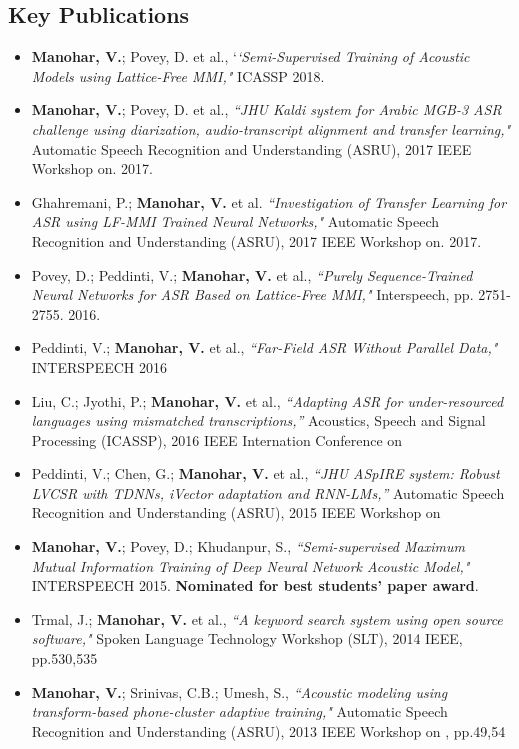 \documentclass[margin,line,pifont,palatino,courier]{res}
\begin{document}
\begin{resume}
\section{\sc Key Publications}
\begin{itemize}
  \item 
  \textbf{Manohar, V.}; Povey, D. et al., `\textit{`Semi-Supervised Training of Acoustic Models using Lattice-Free MMI,"} ICASSP 2018.
  \item
    \textbf{Manohar, V.}; Povey, D. et al., \textit{``JHU Kaldi system for Arabic MGB-3 ASR challenge using diarization, audio-transcript alignment and transfer learning,"} Automatic Speech Recognition and Understanding (ASRU), 2017 IEEE Workshop on. 2017.
  \item 
  Ghahremani, P.; \textbf{Manohar, V.} et al. \textit{``Investigation of Transfer Learning for ASR using LF-MMI Trained Neural Networks,"} Automatic Speech Recognition and Understanding (ASRU), 2017 IEEE Workshop on. 2017.
  \item
    Povey, D.; Peddinti, V.; \textbf{Manohar, V.} et al., \textit{``Purely Sequence-Trained Neural Networks for ASR Based on Lattice-Free MMI,"} Interspeech, pp. 2751-2755. 2016.
  \item
    Peddinti, V.; \textbf{Manohar, V.} et al., 
    \textit{``Far-Field ASR Without Parallel Data,"}
    INTERSPEECH 2016
  \item 
    Liu, C.; Jyothi, P.; \textbf{Manohar, V.} et al.,
    \textit{``Adapting ASR for under-resourced languages using mismatched
    transcriptions,''}
    Acoustics, Speech and Signal Processing (ICASSP), 2016 IEEE Internation Conference on 
  \item 
    Peddinti, V.; Chen, G.; \textbf{Manohar, V.} et al.,
    \textit{``JHU ASpIRE system: Robust LVCSR with TDNNs, iVector adaptation and
    RNN-LMs,''}
    Automatic Speech Recognition and Understanding (ASRU), 2015 IEEE Workshop
    on
  \item 
    \textbf{Manohar, V.}; Povey, D.; Khudanpur, S., 
    \textit{``Semi-supervised Maximum Mutual Information Training of Deep Neural
    Network Acoustic Model,"}
    INTERSPEECH 2015. \textbf{Nominated for best students' paper award}.
  \item
    Trmal, J.; \textbf{Manohar, V.} et al., 
    \textit{``A keyword search system using open source software," } 
    Spoken Language Technology Workshop (SLT), 2014 IEEE, pp.530,535
  \item
    \textbf{Manohar, V.}; Srinivas, C.B.; Umesh, S., 
    \textit{``Acoustic modeling
    using transform-based phone-cluster adaptive training,"} 
    Automatic Speech Recognition and Understanding (ASRU), 2013 IEEE Workshop on
    , pp.49,54
\end{itemize}

\end{resume}
\end{document}
